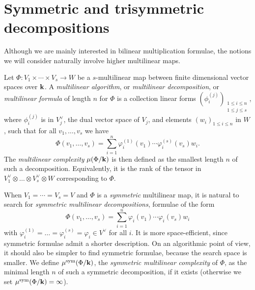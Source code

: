\documentclass[11pt]{article}
\begin{document}
\section{Symmetric and trisymmetric decompositions}
\label{sec:symtrisym}

Although we are mainly interested in bilinear multiplication formulae,
the notions we will consider naturally involve higher multilinear maps.

Let $\Phi:V_1\times\cdots\times V_s\to W$
be a $s$-multilinear map between finite dimensional vector spaces over $\mathbf{k}$.
A \emph{multilinear algorithm}, or \emph{multilinear decomposition}, or \emph{multilinear formula} of length $n$ for $\Phi$ is a collection linear
forms $(\phi_i^{(j)})_{\substack{1\leq i \leq n\\1\leq j\leq s}}$,
where $\phi_i^{(j)}$ is in $V_j^\vee$, the dual vector space of $V_j$,
and elements $(w_i)_{1\leq i \leq n}$ in $W$, 
such that for all $v_1,\dots,v_s$ we have
\[
  \Phi(v_1,\dots,v_s)=\sum_{i=1}^{n}\varphi_i^{(1)}(v_1)\cdots\varphi_i^{(s)}(v_s)w_i.
\]
The \emph{multilinear complexity} $\mu(\Phi/\mathbf{k})$ is then defined as the smallest
length $n$ of such a decomposition.
Equivalently, it is the rank of the tensor in
$V_1^\vee \otimes\dots\otimes V_s^\vee\otimes W$
corresponding to $\Phi$.

When $V_1=\cdots=V_s=V$ and $\Phi$ is a \emph{symmetric} multilinear map, it is
natural to search for \emph{symmetric multilinear decompositions}, \ie formulae of the form
\begin{equation*}
  \Phi(v_1,\dots,v_s)=\sum_{i=1}^{n}\varphi_i(v_1)\cdots\varphi_i(v_s)w_i
\end{equation*}
with $\varphi_i^{(1)}=\dots=\varphi_i^{(s)}=\varphi_i\in V^\vee$ for all $i$.
It is more space-efficient, since symmetric formulae admit a shorter description.
On an algorithmic point of view, it should also be simpler to find symmetric formulae,
because the search space is smaller. 
We define $\mu^{\text{sym}}(\Phi/\mathbf{k})$,
the \emph{symmetric multilinear complexity} of $\Phi$,
as the minimal length $n$ of such a symmetric decomposition, if it exists
(otherwise we set $\mu^{\text{sym}}(\Phi/\mathbf{k})=\infty$).
\end{document}
